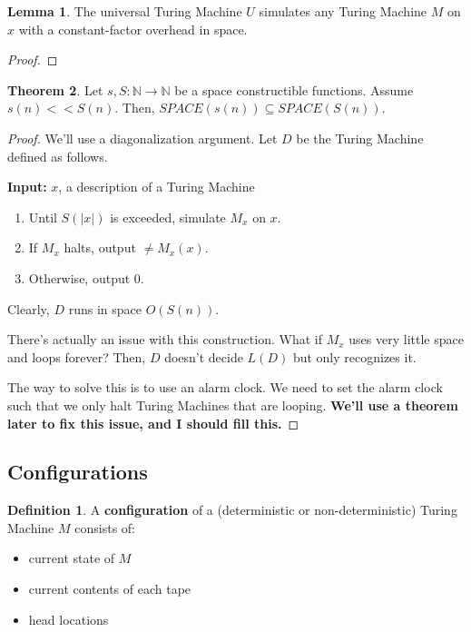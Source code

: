 \documentclass{article}
\theoremstyle{definition}
\newtheorem{definition}{Definition}
\newtheorem{theorem}{Theorem}[section]
\newtheorem{lemma}[theorem]{Lemma}
\begin{document}
\begin{lemma}
    The universal Turing Machine $U$ simulates any Turing Machine $M$ on $x$ with a constant-factor overhead in space. 
\end{lemma}
\begin{proof}
    
\end{proof}


\begin{theorem}
    Let $s,S: \mathbb{N} \xrightarrow{} \mathbb{N}$ be a space constructible functions. Assume $s(n) << S(n)$. Then, $SPACE(s(n)) \subseteq SPACE(S(n))$.
\end{theorem}
\begin{proof}
    We'll use a diagonalization argument. Let $D$ be the Turing Machine defined as follows.

    \textbf{Input:} $x$, a description of a Turing Machine
    \begin{enumerate}
        \item Until $S(\lvert x \rvert)$ is exceeded, simulate $M_{x}$ on $x$.
        \item If $M_{x}$ halts, output $\neq M_{x}(x)$.
        \item Otherwise, output 0.
    \end{enumerate}

    Clearly, $D$ runs in space $O(S(n))$. 

    There's actually an issue with this construction. What if $M_{x}$ uses very little space and loops forever? Then, $D$ doesn't decide $L(D)$ but only recognizes it. 
    
    The way to solve this is to use an alarm clock. We need to set the alarm clock such that we only halt Turing Machines that are looping. \textbf{We'll use a theorem later to fix this issue, and I should fill this.}
\end{proof}

\subsection{Configurations}

\begin{definition}
    A \textbf{configuration} of a (deterministic or non-deterministic) Turing Machine $M$ consists of:
    \begin{itemize}
        \item current state of $M$
        \item current contents of each tape
        \item head locations
    \end{itemize}
\end{definition}
\end{document}
